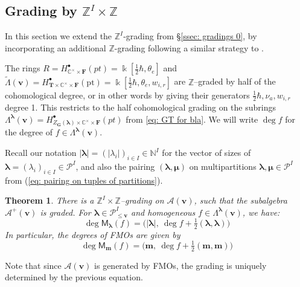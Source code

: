 \documentclass[11pt,reqno]{amsart}
\renewcommand{\mathbf}{\mathbold}
\numberwithin{equation}{section}
\newtheorem{Theorem}[equation]{Theorem}
\theoremstyle{definition}
\newcommand{\cA}{\mathcal{A}}
\newcommand{\bF}{\mathbf{F}}
\newcommand{\bG}{\mathbf{G}}
\newcommand{\cP}{\mathcal{P}}
\newcommand{\bT}{\mathbf{T}}
\newcommand{\bm}{\mathbf{m}}
\newcommand{\bv}{\mathbf{v}}
\newcommand{\CC}{\mathbb{C}}
\newcommand{\NN}{\mathbb{N}}
\newcommand{\ZZ}{\mathbb{Z}}
\newcommand{\pt}{\mathrm{pt}}
\newcommand{\kk}{\Bbbk}
\renewcommand{\bv}{\mathbf{v}} %
\newcommand{\M}{\mathsf{M}}
\newcommand{\vertexset}{I}
\newcommand{\GT}{\Lambda}
\newcommand{\tGT}{\widetilde{\Lambda}}
\newcommand{\base}{R}
\newcommand{\Partitions}{\cP}
\newcommand{\la}{\lambda}
\newcommand{\bla}{{\boldsymbol{\lambda}}}
\newcommand{\bmu}{{\boldsymbol{\mu}}}
\newcommand{\qzast}{\cA}
\newcommand{\qzastplus}{\cA^{+}}
\begin{document}
\subsection{Grading by $\ZZ^\vertexset\times \ZZ$}
\label{ssec: gradings}
In this section we extend the $\ZZ^\vertexset$-grading from \S \ref{ssec: gradings 0}, by incorporating an additional $\ZZ$-grading following a similar strategy to \cite[Remark 2.8]{BFN1}.

The rings $\base = H_{\CC^\times \times \bF}^\bullet(pt) = \kk[\tfrac{1}{2}\hbar, \theta_e]$ and $\tGT(\bv) = H_{\bT\times \CC^\times\times \bF}^\bullet(\pt) = \kk[\tfrac{1}{2}\hbar, \theta_e, w_{i,r}]$ are $\ZZ$--graded by {half} of the cohomological degree, or in other words by giving their generators $\tfrac{1}{2} \hbar, \nu_a, w_{i,r}$ degree 1.   This restricts to the half cohomological grading on the subrings $\GT^{\bla}(\bv) = H_{Z_{\bG}(\bla)\times \CC^\times \times \bF}^\bullet(pt)$ from \eqref{eq: GT for bla}.  We will write $\deg f$ for the degree of $f\in \GT^{\bla}(\bv)$.  

Recall our notation $|\bla| = (|\la_i|)_{i \in \vertexset} \in \NN^\vertexset$ for the vector of sizes of $\bla = (\la_i)_{i \in\vertexset} \in \Partitions^\vertexset$, and also the pairing $(\bla, \bmu)$ on multipartitions $\bla, \bmu \in \Partitions^{\vertexset}$ from (\ref{eq: pairing on tuples of partitions}). 
\begin{Theorem}
\label{thm: grading}
There is a $\ZZ^{\vertexset} \times \ZZ$--grading on $\qzast(\bv)$, such that the subalgebra $\qzastplus(\bv)$ is graded.  For $\bla \in \Partitions_{\leq \bv}^\vertexset$ and homogeneous $f \in \GT^\bla(\bv)$, we have:
$$
\deg \M_{\bla}(f) = \big( |\bla|, \ \deg f +  \tfrac{1}{2}(\bla,\bla) \big)
$$
In particular, the degrees of FMOs are given by
$$
\deg \M_\bm(f) = \big(\bm, \ \deg f + \tfrac{1}{2}(\bm,\bm) \big)
$$
\end{Theorem}
Note that since $\qzast(\bv)$ is generated by FMOs, the grading is uniquely determined by the previous equation.
\end{document}
